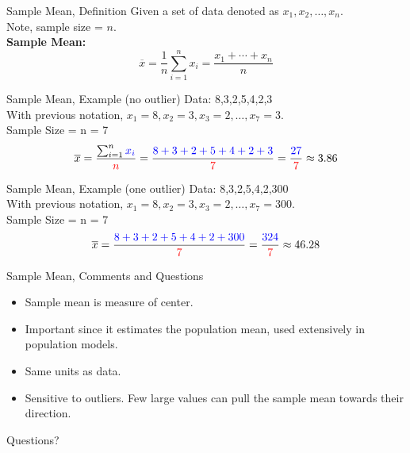 \documentclass{beamer}
\newcommand{\blue}[1]{{\color{blue} #1}}
\newcommand{\red}[1]{{\color{red} #1}}
\newcommand{\qtns}[0]{\begin{center} Questions? \end{center}}
\newcommand{\nl}[1]{\vspace{#1 em}}
\begin{document}
\begin{frame}{Sample Mean, Definition}
    Given a set of data denoted as $x_1, x_2, \ldots, x_n$. \\
    Note, sample size = $n$.\\
    \nl{1}
    {\bf Sample Mean:}
    $$\overline{x} = \frac1n\sum_{i=1}^n x_i = \frac{x_1+\cdots+x_n}n$$
\end{frame}

\begin{frame}{Sample Mean, Example (no outlier)}
    Data: 8,3,2,5,4,2,3\\
    \nl{0.5}
    With previous notation, \blue{$x_1=8, x_2 =3, x_3 = 2, \ldots, x_7 = 3$}.\\
    \nl{0.5}
    \red{Sample Size = n = 7}
    \[\overline{x} = \frac{\sum_{i=1}^n \blue{x_i}}{\red{n}} = \frac{\blue{8+3+2+5+4+2+3}}{\red{7}} = \frac{\blue{27}}{\red{7}} \approx 3.86\]
\end{frame}

\begin{frame}{Sample Mean, Example (one outlier)}
    Data: 8,3,2,5,4,2,300\\
    \nl{0.5}
    With previous notation, \blue{$x_1=8, x_2 =3, x_3 = 2, \ldots, x_7 = 300$}.\\
    \nl{0.5}
    \red{Sample Size = n = 7}
    \[\overline{x} = \frac{\blue{8+3+2+5+4+2+300}}{\red{7}} = \frac{\blue{324}}{\red{7}} \approx 46.28\]
\end{frame}

\begin{frame}{Sample Mean, Comments and Questions}
    \begin{itemize}
        \item Sample mean is measure of center. 
        \item Important since it estimates the population mean, used extensively in population models.
        \item Same units as data.
        \item Sensitive to outliers. Few large values can pull the sample mean towards their direction.
    \end{itemize}
    \qtns
\end{frame}
\end{document}
